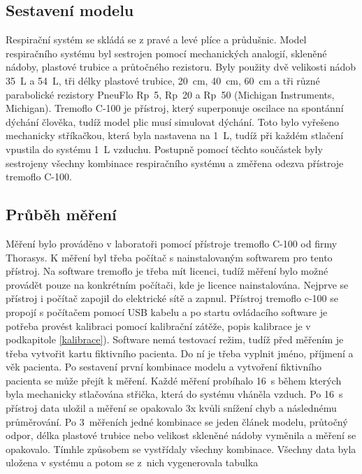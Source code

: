 \subsection{Sestavení modelu}
Respirační systém se skládá se z pravé a levé plíce a průdušnic. Model respiračního systému  byl sestrojen pomocí mechanických analogií, skleněné nádoby, plastové trubice a průtočného rezistoru. Byly použity dvě velikosti nádob \SI{35}{L} a \SI{54}{L}, tři délky plastové trubice, \SI{20}{cm},  \SI{40}{cm},  \SI{60}{cm}  a tři různé parabolické rezistory PneuFlo Rp~5, Rp~20 a Rp~50 (Michigan Instruments, Michigan). 
Tremoflo C-100 je přístroj, který superponuje oscilace na spontánní dýchání člověka, tudíž model plic musí simulovat dýchání. Toto bylo vyřešeno mechanicky stříkačkou, která byla nastavena na  \SI{1}{L}, tudíž při každém stlačení vpustila do systému  \SI{1}{L} vzduchu. 
Postupně pomocí těchto součástek byly sestrojeny všechny kombinace respiračního systému a změřena odezva přístroje tremoflo C-100.

\subsection{Průběh měření}
Měření bylo prováděno v laboratoři pomocí přístroje tremoflo C-100 od firmy Thorasys. K měření byl třeba počítač s nainstalovaným softwarem pro tento přístroj. Na software tremoflo je třeba mít licenci, tudíž měření bylo možné provádět pouze na konkrétním počítači, kde je licence nainstalována.  Nejprve se přístroj i počítač zapojil do elektrické sítě a zapnul. Přístroj tremoflo c-100 se propojí s počítačem pomocí USB kabelu a po startu ovládacího software je potřeba provést kalibraci pomocí kalibrační zátěže, popis kalibrace je v podkapitole \ref{kalibrace}). Software nemá testovací režim, tudíž před měřením je třeba vytvořit kartu fiktivního pacienta. Do ní je třeba vyplnit  jméno, příjmení a věk pacienta. Po sestavení první kombinace modelu a vytvoření fiktivního pacienta se může přejít k měření. Každé měření probíhalo  \SI{16}{s} během kterých byla mechanicky stlačována střička, která do systému vháněla vzduch. Po  \SI{16}{s} přístroj data uložil a měření se opakovalo 3x kvůli snížení chyb a následnému průměrování. Po 3~měřeních jedné kombinace se jeden článek modelu, průtočný odpor, délka plastové trubice nebo velikost skleněné nádoby vyměnila a měření se opakovalo. Tímhle způsobem se vystřídaly všechny kombinace. Všechny data byla uložena v systému a potom se z~nich vygenerovala tabulka


